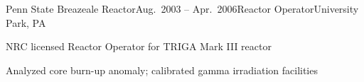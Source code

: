 


\begin{rSubsection}{Penn State Breazeale Reactor}{Aug.\ 2003 -- Apr.\ 2006}{Reactor Operator}{University Park, PA}
\item NRC licensed Reactor Operator for TRIGA Mark III reactor
\item Analyzed core burn-up anomaly; calibrated gamma irradiation facilities
\end{rSubsection}
